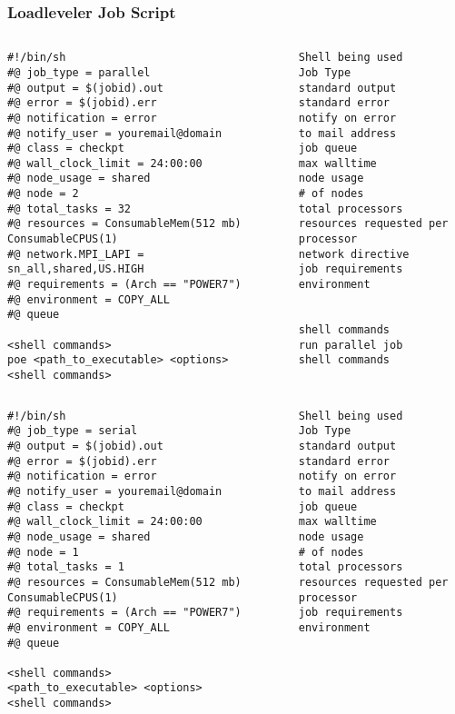 \documentclass[slidestop,mathserif,compress,xcolor=svgnames,table]{beamer}
\newenvironment{ablock}[0]
{
\begin{beamerboxesrounded}[upper=uppercol,lower=lowercol,shadow=true]}
{\end{beamerboxesrounded}}
\newenvironment{eblock}[0]
{
\begin{beamerboxesrounded}[upper=uppercol2,lower=lowercol2,shadow=true]}
{\end{beamerboxesrounded}}
\begin{document}
\begin{frame}
\frametitle{\small Loadleveler Job Script}
\vspace{-0.5cm}
\begin{columns}
\column{7.2cm}
\begin{eblock}{}
{\tiny
\begin{verbatim}
#!/bin/sh
#@ job_type = parallel 
#@ output = $(jobid).out
#@ error = $(jobid).err
#@ notification = error
#@ notify_user = youremail@domain
#@ class = checkpt
#@ wall_clock_limit = 24:00:00
#@ node_usage = shared
#@ node = 2
#@ total_tasks = 32
#@ resources = ConsumableMem(512 mb) ConsumableCPUS(1)
#@ network.MPI_LAPI = sn_all,shared,US.HIGH
#@ requirements = (Arch == "POWER7")
#@ environment = COPY_ALL
#@ queue

<shell commands>			
poe <path_to_executable> <options>
<shell commands>
\end{verbatim}
}
\end{eblock}
\column{4.5cm}
\begin{ablock}{}
{\tiny %
\begin{verbatim}
Shell being used
Job Type
standard output
standard error
notify on error
to mail address
job queue
max walltime
node usage
# of nodes
total processors
resources requested per processor
network directive
job requirements
environment


shell commands
run parallel job
shell commands
\end{verbatim}
}
\end{ablock}
\end{columns}
\newpage
\vspace{-0.5cm}
\begin{columns}
\column{7.2cm}
\begin{eblock}{}
{\tiny
\begin{verbatim}
#!/bin/sh
#@ job_type = serial 
#@ output = $(jobid).out
#@ error = $(jobid).err
#@ notification = error
#@ notify_user = youremail@domain
#@ class = checkpt
#@ wall_clock_limit = 24:00:00
#@ node_usage = shared
#@ node = 1
#@ total_tasks = 1
#@ resources = ConsumableMem(512 mb) ConsumableCPUS(1)
#@ requirements = (Arch == "POWER7")
#@ environment = COPY_ALL
#@ queue

<shell commands>			
<path_to_executable> <options>
<shell commands>
\end{verbatim}
}
\end{eblock}
\column{4.5cm}
\begin{ablock}{}
{\tiny %
\begin{verbatim}
Shell being used
Job Type
standard output
standard error
notify on error
to mail address
job queue
max walltime
node usage
# of nodes
total processors
resources requested per processor
job requirements
environment



\end{verbatim}}
\end{ablock}
\end{columns}
\end{frame}
\end{document}
